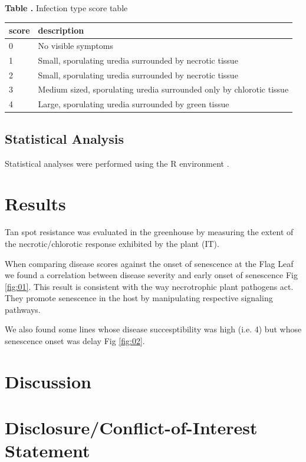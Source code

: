 \documentclass{frontiersSCNS} %
\begin{document}
\begin{table}[!t]
\textbf{\label{Tab:02} Table .}{ Infection type score table}\\
\processtable{}
{\begin{tabular}{l|l}
\hline
	score & description \\\midrule
	0 & No visible symptoms \\
	1  & Small, sporulating uredia surrounded by necrotic tissue \\
	2 & Small, sporulating uredia surrounded by necrotic tissue \\
	3 & Medium sized, sporulating uredia surrounded only by chlorotic tissue \\
	4 & Large, sporulating uredia surrounded by green tissue \\ \hline
\end{tabular}}{}
\end{table}


\subsection{Statistical Analysis}
Statistical analyses were performed using the R environment \cite{RManual}. 

\section{Results}
Tan spot resistance was evaluated in the greenhouse by measuring the extent of the necrotic/chlorotic response exhibited by the plant (IT).

When comparing disease scores against the onset of senescence at the Flag Leaf we found a correlation between disease severity and early onset of senescence Fig \ref{fig:01}. This result is consistent with the way necrotrophic plant pathogens act. They promote senescence in the host by manipulating respective signaling pathways. 

We also found some lines whose disease succesptibility was high (i.e. 4) but whose senescence onset was delay Fig \ref{fig:02}. 


\section{Discussion}



\section*{Disclosure/Conflict-of-Interest Statement}
\end{document}
